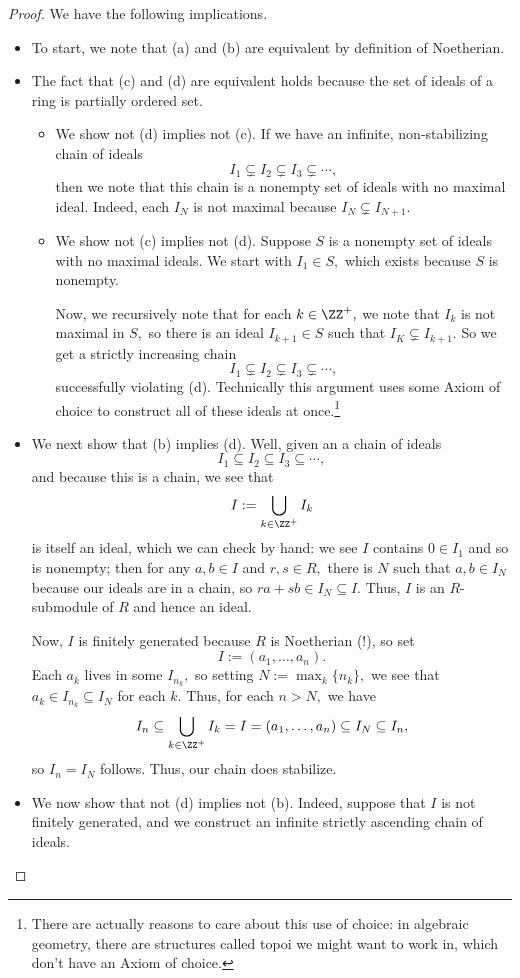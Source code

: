 \documentclass[../notes.tex]{subfiles}
\begin{document}
\begin{proof}
	We have the following implications.
	\begin{itemize}
		\item To start, we note that (a) and (b) are equivalent by definition of Noetherian.
		\item The fact that (c) and (d) are equivalent holds because the set of ideals of a ring is partially ordered set.
		\begin{itemize}
			\item We show not (d) implies not (c). If we have an infinite, non-stabilizing chain of ideals
			\[I_1\subsetneq I_2\subsetneq I_3\subsetneq\cdots,\]
			then we note that this chain is a nonempty set of ideals with no maximal ideal. Indeed, each $I_N$ is not maximal because $I_N\subsetneq I_{N+1}.$
			\item We show not (c) implies not (d). Suppose $S$ is a nonempty set of ideals with no maximal ideals. We start with $I_1\in S,$ which exists because $S$ is nonempty.
			
			Now, we recursively note that for each $k\in\ZZ^+,$ we note that $I_k$ is not maximal in $S,$ so there is an ideal $I_{k+1}\in S$ such that $I_K\subsetneq I_{k+1}.$ So we get a strictly increasing chain
			\[I_1\subsetneq I_2\subsetneq I_3\subsetneq\cdots,\]
			successfully violating (d). Technically this argument uses some Axiom of choice to construct all of these ideals at once.\footnote{There are actually reasons to care about this use of choice: in algebraic geometry, there are structures called topoi we might want to work in, which don't have an Axiom of choice.}
		\end{itemize}
		\item We next show that (b) implies (d). Well, given an a chain of ideals
		\[I_1\subseteq I_2\subseteq I_3\subseteq\cdots,\]
		and because this is a chain, we see that
		\[I:=\bigcup_{k\in\ZZ^+}I_k\]
		is itself an ideal, which we can check by hand: we see $I$ contains $0\in I_1$ and so is nonempty; then for any $a,b\in I$ and $r,s\in R,$ there is $N$ such that $a,b\in I_N$ because our ideals are in a chain, so $ra+sb\in I_N\subseteq I.$ Thus, $I$ is an $R$-submodule of $R$ and hence an ideal.
		
		Now, $I$ is finitely generated because $R$ is Noetherian (!), so set
		\[I:=(a_1,\ldots,a_n).\]
		Each $a_k$ lives in some $I_{n_k},$ so setting $N:=\max_k\{n_k\},$ we see that $a_k\in I_{n_k}\subseteq I_N$ for each $k.$ Thus, for each $n>N,$ we have
		\[I_n\subseteq\bigcup_{k\in\ZZ^+}I_k=I=(a_1,\ldots,a_n)\subseteq I_N\subseteq I_n,\]
		so $I_n=I_N$ follows. Thus, our chain does stabilize.
		\item We now show that not (d) implies not (b). Indeed, suppose that $I$ is not finitely generated, and we construct an infinite strictly ascending chain of ideals.
		

\end{itemize}
\end{proof}
\end{document}

